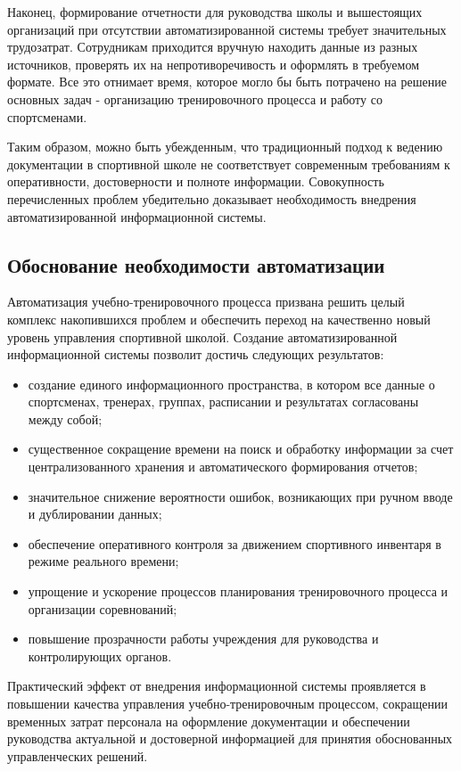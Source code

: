 Наконец, формирование отчетности для руководства школы и вышестоящих организаций при отсутствии автоматизированной системы требует значительных трудозатрат. Сотрудникам приходится вручную находить данные из разных источников, проверять их на непротиворечивость и оформлять в требуемом формате. Все это отнимает время, которое могло бы быть потрачено на решение основных задач - организацию тренировочного процесса и работу со спортсменами.

Таким образом, можно быть убежденным, что традиционный подход к ведению документации в спортивной школе не соответствует современным требованиям к оперативности, достоверности и полноте информации. Совокупность перечисленных проблем убедительно доказывает необходимость внедрения автоматизированной информационной системы.

\subsection{Обоснование необходимости автоматизации}

Автоматизация учебно-тренировочного процесса призвана решить целый комплекс накопившихся проблем и обеспечить переход на качественно новый уровень управления спортивной школой. Создание автоматизированной информационной системы позволит достичь следующих результатов:

\begin{itemize}
	\item создание единого информационного пространства, в котором все данные о спортсменах, тренерах, группах, расписании и результатах согласованы между собой;
	\item существенное сокращение времени на поиск и обработку информации за счет централизованного хранения и автоматического формирования отчетов;
	\item значительное снижение вероятности ошибок, возникающих при ручном вводе и дублировании данных;
	\item обеспечение оперативного контроля за движением спортивного инвентаря в режиме реального времени;
	\item упрощение и ускорение процессов планирования тренировочного процесса и организации соревнований;
	\item повышение прозрачности работы учреждения для руководства и контролирующих органов.
\end{itemize}

Практический эффект от внедрения информационной системы проявляется в повышении качества управления учебно-тренировочным процессом, сокращении временных затрат персонала на оформление документации и обеспечении руководства актуальной и достоверной информацией для принятия обоснованных управленческих решений.

